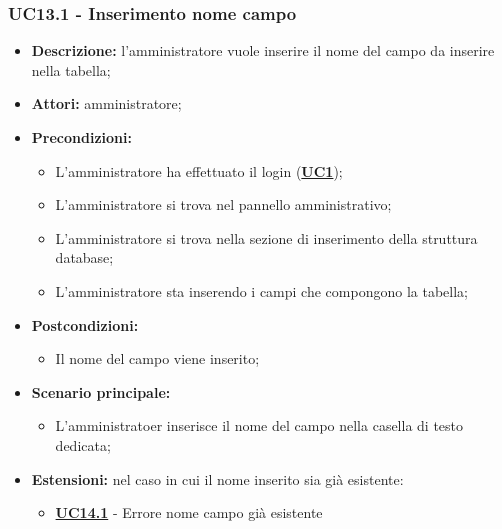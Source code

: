\subsubsection{UC13.1 - Inserimento nome campo}
\label{sec:UC13.1}
\begin{itemize}
	\item \textbf{Descrizione:} l’amministratore vuole inserire il nome del campo da inserire nella tabella;
	\item \textbf{Attori:} amministratore;
	\item \textbf{Precondizioni:} 
	\begin{itemize}
		\item L’amministratore ha effettuato il login (\hyperref[sec:UC1]{\textbf{UC1}});
		\item L’amministratore si trova nel pannello amministrativo;
		\item L’amministratore si trova nella sezione di inserimento della struttura database;
		\item L’amministratore sta inserendo i campi che compongono la tabella;
	\end{itemize}
	\item \textbf{Postcondizioni:} 
	\begin{itemize}
		\item Il nome del campo viene inserito;
	\end{itemize}
	\item \textbf{Scenario principale:} 
	\begin{itemize}
		\item L’amministratoer inserisce il nome del campo nella casella di testo dedicata;
	\end{itemize}
	\item \textbf{Estensioni:} nel caso in cui il nome inserito sia già esistente:
	\begin{itemize}
		\item \hyperref[sec:UC14.1]{\textbf{UC14.1}} - Errore nome campo già esistente
	\end{itemize}
\end{itemize}

